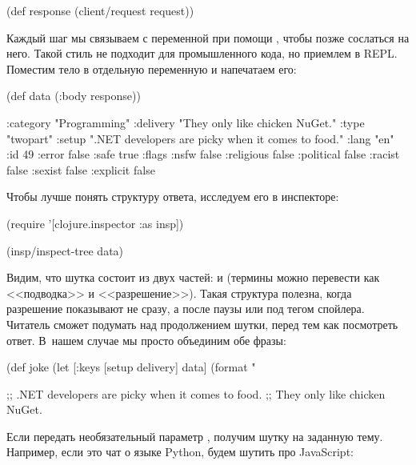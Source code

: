 \begin{english}
  \begin{clojure}
(def response
  (client/request request))
  \end{clojure}
\end{english}

Каждый шаг мы связываем с переменной при помощи , чтобы позже сослаться на него. Такой стиль не подходит для промышленного кода, но приемлем в REPL. Поместим тело в отдельную переменную и напечатаем его:

\begin{english}
  \begin{clojure}
(def data
  (:body response))

{:category "Programming"
 :delivery "They only like chicken NuGet."
 :type "twopart"
 :setup ".NET developers are picky when it comes to food."
 :lang "en"
 :id 49
 :error false
 :safe true
 :flags
 {:nsfw false
  :religious false
  :political false
  :racist false
  :sexist false
  :explicit false}}
  \end{clojure}
\end{english}

Чтобы лучше понять структуру ответа, исследуем его в инспекторе:

\begin{english}
  \begin{clojure}
(require '[clojure.inspector :as insp])

(insp/inspect-tree data)
  \end{clojure}
\end{english}

Видим, что шутка состоит из двух частей:  и  (термины можно перевести как <<подводка>> и <<разрешение>>). Такая структура полезна, когда разрешение показывают не сразу, а после паузы или под тегом спойлера. Читатель сможет подумать над продолжением шутки, перед тем как посмотреть ответ. В~нашем случае мы просто объединим обе фразы:

\begin{english}
  \begin{clojure}
(def joke
  (let [{:keys [setup
                delivery]} data]
    (format "%

;; .NET developers are picky when it comes to food.
;; They only like chicken NuGet.
  \end{clojure}
\end{english}

Если передать необязательный параметр , получим шутку на заданную тему. Например, если это чат о языке Python, будем шутить про JavaScript:

